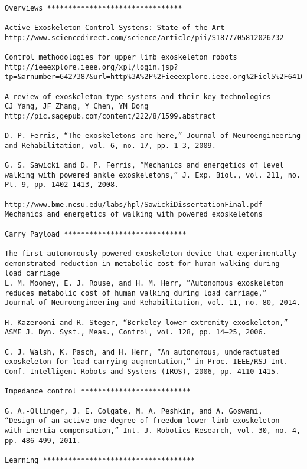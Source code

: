 \documentclass[letterpaper,12pt,fullpage]{article}
\begin{document}
\begin{verbatim}

Overviews ********************************

Active Exoskeleton Control Systems: State of the Art
http://www.sciencedirect.com/science/article/pii/S1877705812026732

Control methodologies for upper limb exoskeleton robots
http://ieeexplore.ieee.org/xpl/login.jsp?tp=&arnumber=6427387&url=http%3A%2F%2Fieeexplore.ieee.org%2Fiel5%2F6416132%2F6426928%2F06427387.pdf%3Farnumber%3D6427387

A review of exoskeleton-type systems and their key technologies
CJ Yang, JF Zhang, Y Chen, YM Dong
http://pic.sagepub.com/content/222/8/1599.abstract

D. P. Ferris, “The exoskeletons are here,” Journal of Neuroengineering
and Rehabilitation, vol. 6, no. 17, pp. 1–3, 2009.

G. S. Sawicki and D. P. Ferris, “Mechanics and energetics of level
walking with powered ankle exoskeletons,” J. Exp. Biol., vol. 211, no.
Pt. 9, pp. 1402–1413, 2008.

http://www.bme.ncsu.edu/labs/hpl/SawickiDissertationFinal.pdf
Mechanics and energetics of walking with powered exoskeletons

Carry Payload *****************************

The first autonomously powered exoskeleton device that experimentally
demonstrated reduction in metabolic cost for human walking during
load carriage
L. M. Mooney, E. J. Rouse, and H. M. Herr, “Autonomous exoskeleton
reduces metabolic cost of human walking during load carriage,”
Journal of Neuroengineering and Rehabilitation, vol. 11, no. 80, 2014.

H. Kazerooni and R. Steger, “Berkeley lower extremity exoskeleton,”
ASME J. Dyn. Syst., Meas., Control, vol. 128, pp. 14–25, 2006.

C. J. Walsh, K. Pasch, and H. Herr, “An autonomous, underactuated
exoskeleton for load-carrying augmentation,” in Proc. IEEE/RSJ Int.
Conf. Intelligent Robots and Systems (IROS), 2006, pp. 4110–1415.

Impedance control **************************

G. A.-Ollinger, J. E. Colgate, M. A. Peshkin, and A. Goswami,
“Design of an active one-degree-of-freedom lower-limb exoskeleton
with inertia compensation,” Int. J. Robotics Research, vol. 30, no. 4,
pp. 486–499, 2011.

Learning ************************************


\end{verbatim}
\end{document}
